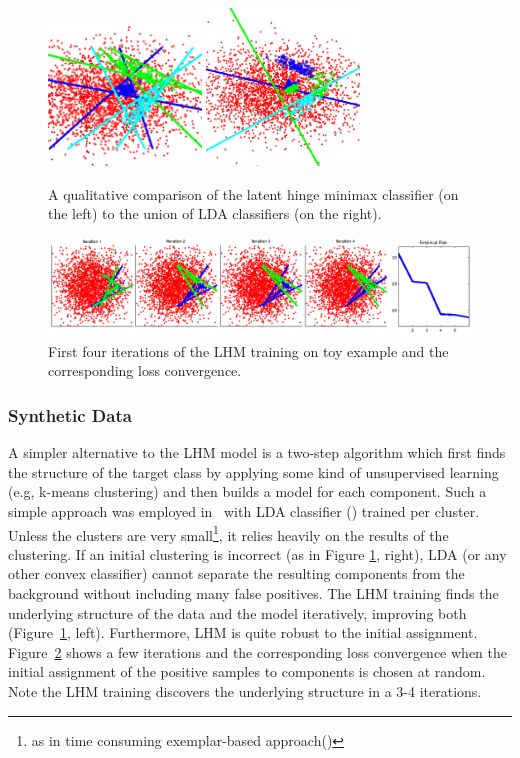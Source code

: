 \documentclass[twoside,11pt]{article}
\begin{document}
\begin{figure}[t]
\center
\includegraphics[width=1.6in]{MW_bad_clustering_new.png}\hspace{0.4cm}
\includegraphics[width=1.6in]{LDA_OR_bad_clustering.png}
\caption{A qualitative comparison of the latent hinge minimax classifier (on the left) to the union of LDA classifiers (on the right).}
\label{LDAvsLHM_toy}
\end{figure}

\begin{figure}[h]
\center
\includegraphics[width=\linewidth]{demo2.png}
\caption{First four iterations of the LHM training on toy example and the corresponding loss convergence. }
\label{fig:2d_example2}
\end{figure}
\subsubsection{Synthetic Data}\label{sec:synthetic_ex}
A simpler alternative to the LHM model is a two-step algorithm which first finds the structure of the target class by applying some kind of unsupervised learning (e.g, k-means clustering) and then builds a model for each component. Such a simple approach was employed in~\cite{Deva} with LDA classifier (\cite{LDA}) trained per cluster. Unless the clusters are very small\footnote{as in time consuming exemplar-based approach(\cite{eSVM})}, it relies heavily on the results of the clustering. If an initial clustering is incorrect (as in Figure \ref{LDAvsLHM_toy}, right), LDA (or any other convex classifier) cannot separate the resulting components from the background without including many false positives.  The LHM  training finds the underlying structure of the data and the model iteratively, improving both (Figure~\ref{LDAvsLHM_toy}, left). Furthermore, LHM is quite robust to the initial assignment. Figure~\ref{fig:2d_example2} shows a few iterations and the corresponding loss convergence when the  initial assignment of the positive samples to components is chosen at random. Note the LHM training discovers the underlying structure in a 3-4 iterations.
\end{document}
